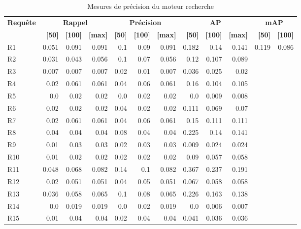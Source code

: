 \begin{table}[H]
\centering
\begin{tabular}{l|rrr|rrr|rrr|rr}
\toprule
\textbf{Requête} & \multicolumn{3}{c}{\textbf{Rappel}} & \multicolumn{3}{c}{\textbf{Précision}} & \multicolumn{3}{c}{\textbf{AP}} & \multicolumn{2}{c}{\textbf{mAP}} \\
 & \textbf{[50]} & \textbf{[100]} & \textbf{[max]} & \textbf{[50]} & \textbf{[100]} & \textbf{[max]} & \textbf{[50]} & \textbf{[100]} & \textbf{[max]} & \textbf{[50]} & \textbf{[100]} \\
\midrule
R1 & 0.051 & 0.091 & 0.091 & 0.1 & 0.09 & 0.091 & 0.182 & 0.14 & 0.141 & \multirow{15}{*}{0.119} & \multirow{15}{*}{0.086} \\
R2 & 0.031 & 0.043 & 0.056 & 0.1 & 0.07 & 0.056 & 0.12 & 0.107 & 0.089 \\
R3 & 0.007 & 0.007 & 0.007 & 0.02 & 0.01 & 0.007 & 0.036 & 0.025 & 0.02 \\
R4 & 0.02 & 0.061 & 0.061 & 0.04 & 0.06 & 0.061 & 0.16 & 0.104 & 0.105 \\
R5 & 0.0 & 0.02 & 0.02 & 0.0 & 0.02 & 0.02 & 0.0 & 0.009 & 0.008 \\
R6 & 0.02 & 0.02 & 0.02 & 0.04 & 0.02 & 0.02 & 0.111 & 0.069 & 0.07 \\
R7 & 0.02 & 0.061 & 0.061 & 0.04 & 0.06 & 0.061 & 0.15 & 0.111 & 0.111 \\
R8 & 0.04 & 0.04 & 0.04 & 0.08 & 0.04 & 0.04 & 0.225 & 0.14 & 0.141 \\
R9 & 0.01 & 0.03 & 0.03 & 0.02 & 0.03 & 0.03 & 0.009 & 0.024 & 0.024 \\
R10 & 0.01 & 0.02 & 0.02 & 0.02 & 0.02 & 0.02 & 0.09 & 0.057 & 0.058 \\
R11 & 0.048 & 0.068 & 0.082 & 0.14 & 0.1 & 0.082 & 0.367 & 0.237 & 0.191 \\
R12 & 0.02 & 0.051 & 0.051 & 0.04 & 0.05 & 0.051 & 0.067 & 0.058 & 0.058 \\
R13 & 0.036 & 0.058 & 0.065 & 0.1 & 0.08 & 0.065 & 0.226 & 0.163 & 0.138 \\
R14 & 0.0 & 0.019 & 0.019 & 0.0 & 0.02 & 0.019 & 0.0 & 0.006 & 0.007 \\
R15 & 0.01 & 0.04 & 0.04 & 0.02 & 0.04 & 0.04 & 0.041 & 0.036 & 0.036 \\
\bottomrule
\end{tabular}
\caption{Mesures de précision du moteur recherche}
\label{tab:results}
\end{table}
